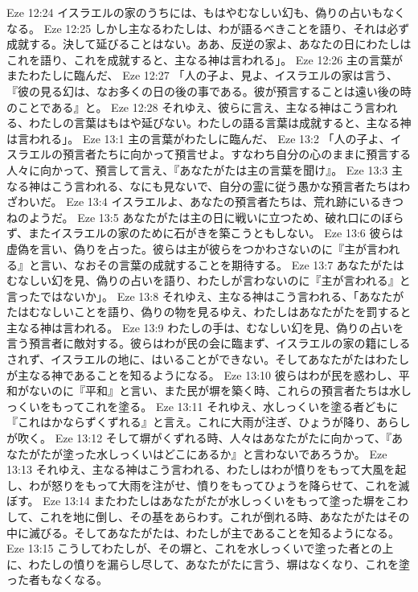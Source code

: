 Eze 12:24  イスラエルの家のうちには、もはやむなしい幻も、偽りの占いもなくなる。
Eze 12:25  しかし主なるわたしは、わが語るべきことを語り、それは必ず成就する。決して延びることはない。ああ、反逆の家よ、あなたの日にわたしはこれを語り、これを成就すると、主なる神は言われる」。
Eze 12:26  主の言葉がまたわたしに臨んだ、
Eze 12:27  「人の子よ、見よ、イスラエルの家は言う、『彼の見る幻は、なお多くの日の後の事である。彼が預言することは遠い後の時のことである』と。
Eze 12:28  それゆえ、彼らに言え、主なる神はこう言われる、わたしの言葉はもはや延びない。わたしの語る言葉は成就すると、主なる神は言われる」。
Eze 13:1  主の言葉がわたしに臨んだ、
Eze 13:2  「人の子よ、イスラエルの預言者たちに向かって預言せよ。すなわち自分の心のままに預言する人々に向かって、預言して言え、『あなたがたは主の言葉を聞け』。
Eze 13:3  主なる神はこう言われる、なにも見ないで、自分の霊に従う愚かな預言者たちはわざわいだ。
Eze 13:4  イスラエルよ、あなたの預言者たちは、荒れ跡にいるきつねのようだ。
Eze 13:5  あなたがたは主の日に戦いに立つため、破れ口にのぼらず、またイスラエルの家のために石がきを築こうともしない。
Eze 13:6  彼らは虚偽を言い、偽りを占った。彼らは主が彼らをつかわさないのに『主が言われる』と言い、なおその言葉の成就することを期待する。
Eze 13:7  あなたがたはむなしい幻を見、偽りの占いを語り、わたしが言わないのに『主が言われる』と言ったではないか」。
Eze 13:8  それゆえ、主なる神はこう言われる、「あなたがたはむなしいことを語り、偽りの物を見るゆえ、わたしはあなたがたを罰すると主なる神は言われる。
Eze 13:9  わたしの手は、むなしい幻を見、偽りの占いを言う預言者に敵対する。彼らはわが民の会に臨まず、イスラエルの家の籍にしるされず、イスラエルの地に、はいることができない。そしてあなたがたはわたしが主なる神であることを知るようになる。
Eze 13:10  彼らはわが民を惑わし、平和がないのに『平和』と言い、また民が塀を築く時、これらの預言者たちは水しっくいをもってこれを塗る。
Eze 13:11  それゆえ、水しっくいを塗る者どもに『これはかならずくずれる』と言え。これに大雨が注ぎ、ひょうが降り、あらしが吹く。
Eze 13:12  そして塀がくずれる時、人々はあなたがたに向かって、『あなたがたが塗った水しっくいはどこにあるか』と言わないであろうか。
Eze 13:13  それゆえ、主なる神はこう言われる、わたしはわが憤りをもって大風を起し、わが怒りをもって大雨を注がせ、憤りをもってひょうを降らせて、これを滅ぼす。
Eze 13:14  またわたしはあなたがたが水しっくいをもって塗った塀をこわして、これを地に倒し、その基をあらわす。これが倒れる時、あなたがたはその中に滅びる。そしてあなたがたは、わたしが主であることを知るようになる。
Eze 13:15  こうしてわたしが、その塀と、これを水しっくいで塗った者との上に、わたしの憤りを漏らし尽して、あなたがたに言う、塀はなくなり、これを塗った者もなくなる。
